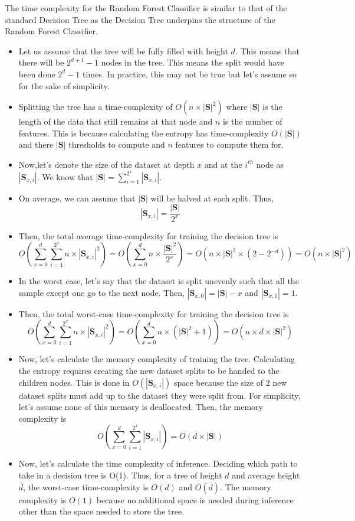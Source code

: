  The time complexity for the Random Forest Classifier is similar to that of the standard Decision Tree as the Decision Tree underpins the structure of the Random Forest Classifier.
\begin{itemize}
	\item Let us assume that the tree will be fully filled with height $d$. This means that there will be $2^{d+1}-1$ nodes in the tree. This means the split would have been done $2^{d}-1$ times. In practice, this may not be true but let's assume so for the sake of simplicity.
	\item Splitting the tree has a time-complexity of $O(n\times|\textbf{S}|^2)$ where $|\textbf{S}|$ is the length of the data that still remains at that node and $n$ is the number of features. This is because calculating the entropy has time-complexity $O(|\textbf{S}|)$ and there $|\textbf{S}|$ thresholds to compute and $n$ features to compute them for.
	\item Now,let's denote the size of the dataset at depth $x$ and at the $i^{th}$ node as $|\textbf{S}_{x,i}|$. We know that $|\textbf{S}|=\sum_{i=1}^{2^x}|\textbf{S}_{x,i}|$. 
	\item On average, we can assume that $|\textbf{S}|$ will be halved at each split. Thus,
	$$|\textbf{S}_{x,i}|=\frac{|\textbf{S}|}{2^x}$$
	\item Then, the total average time-complexity for training the decision tree is 
	$$O(\sum_{x=0}^{d}\sum_{i=1}^{2^x}n\times|\textbf{S}_{x,i}|^2)=O(\sum_{x=0}^{d}n\times\frac{|\textbf{S}|^2}{2^x})=O(n\times|\textbf{S}|^2\times(2-2^{-d}))=O(n\times|\textbf{S}|^2)$$
	\item In the worst case, let's say that the dataset is split unevenly such that all the sample except one go to the next node. Then, $|\textbf{S}_{x,0}|=|\textbf{S}|-x$ and $|\textbf{S}_{x,1}|=1$.
	\item Then, the total worst-case time-complexity for training the decision tree is
	$$O(\sum_{x=0}^{d}\sum_{i=1}^{2^x}n\times|\textbf{S}_{x,i}|^2)=O(\sum_{x=0}^{d}n\times(|\textbf{S}|^2+1))=O(n\times d\times|\textbf{S}|^2)$$
	\item Now, let's calculate the memory complexity of training the tree. Calculating the entropy requires creating the new dataset splits to be handed to the children nodes. This is done in $O(|\textbf{S}_{x,i}|)$ space because the size of 2 new dataset splits must add up to the dataset they were split from. For simplicity, let's assume none of this memory is deallocated. Then, the memory complexity is 
	$$O(\sum_{x=0}^{d}\sum_{i=1}^{2^x}|\textbf{S}_{x,i}|)=O(d\times|\textbf{S}|)$$
	\item Now, let's calculate the time complexity of inference. Deciding which path to take in a decision tree is O(1). Thus, for a tree of height $d$ and average height $\bar{d}$, the worst-case time-complexity is $O(d)$ and $O(\bar{d})$. The memory complexity is $O(1)$ because no additional space is needed during inference other than the space needed to store the tree.
\end{itemize}

